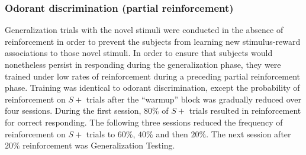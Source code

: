 \subsubsection*{Odorant discrimination (partial reinforcement)}
\label{sec:methods_discrimination}
Generalization trials with the novel stimuli were conducted in the absence of reinforcement in order to prevent the subjects from learning new stimulus-reward associations to those novel stimuli.  
In order to ensure that subjects would nonetheless persist in responding during the generalization phase, they were trained under low rates of reinforcement during a preceding partial reinforcement phase. 
Training was identical to odorant discrimination, except the probability of reinforcement on $S+$ trials after the ``warmup'' block was gradually reduced over four sessions. During the first session, $80\%$ of $S+$ trials resulted in reinforcement for correct responding. The following three sessions reduced the frequency of reinforcement on $S+$ trials to $60\%$, $40\%$ and then $20\%$. The next session after $20\%$ reinforcement was Generalization Testing.


  
  